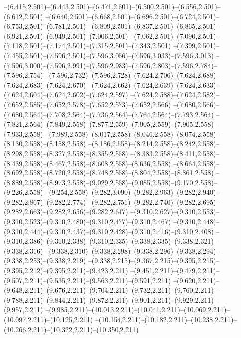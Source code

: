   --(6.415,2.501)--(6.443,2.501)--(6.471,2.501)--(6.500,2.501)--(6.556,2.501)--(6.612,2.501)%
  --(6.640,2.501)--(6.668,2.501)--(6.696,2.501)--(6.724,2.501)--(6.753,2.501)--(6.781,2.501)%
  --(6.809,2.501)--(6.837,2.501)--(6.865,2.501)--(6.921,2.501)--(6.949,2.501)--(7.006,2.501)%
  --(7.062,2.501)--(7.090,2.501)--(7.118,2.501)--(7.174,2.501)--(7.315,2.501)--(7.343,2.501)%
  --(7.399,2.501)--(7.455,2.501)--(7.596,2.501)--(7.596,3.056)--(7.596,3.033)--(7.596,3.013)%
  --(7.596,3.000)--(7.596,2.991)--(7.596,2.983)--(7.596,2.803)--(7.596,2.784)--(7.596,2.754)%
  --(7.596,2.732)--(7.596,2.728)--(7.624,2.706)--(7.624,2.688)--(7.624,2.683)--(7.624,2.670)%
  --(7.624,2.662)--(7.624,2.639)--(7.624,2.633)--(7.624,2.604)--(7.624,2.602)--(7.624,2.597)%
  --(7.624,2.588)--(7.624,2.582)--(7.652,2.585)--(7.652,2.578)--(7.652,2.573)--(7.652,2.566)%
  --(7.680,2.566)--(7.680,2.564)--(7.708,2.564)--(7.736,2.564)--(7.764,2.564)--(7.793,2.564)%
  --(7.821,2.564)--(7.849,2.558)--(7.877,2.559)--(7.905,2.559)--(7.905,2.558)--(7.933,2.558)%
  --(7.989,2.558)--(8.017,2.558)--(8.046,2.558)--(8.074,2.558)--(8.130,2.558)--(8.158,2.558)%
  --(8.186,2.558)--(8.214,2.558)--(8.242,2.558)--(8.298,2.558)--(8.327,2.558)--(8.355,2.558)%
  --(8.383,2.558)--(8.411,2.558)--(8.439,2.558)--(8.467,2.558)--(8.608,2.558)--(8.636,2.558)%
  --(8.664,2.558)--(8.692,2.558)--(8.720,2.558)--(8.748,2.558)--(8.804,2.558)--(8.861,2.558)%
  --(8.889,2.558)--(8.973,2.558)--(9.029,2.558)--(9.085,2.558)--(9.170,2.558)--(9.226,2.558)%
  --(9.254,2.558)--(9.282,3.090)--(9.282,2.963)--(9.282,2.940)--(9.282,2.867)--(9.282,2.774)%
  --(9.282,2.751)--(9.282,2.740)--(9.282,2.695)--(9.282,2.663)--(9.282,2.656)--(9.282,2.647)%
  --(9.310,2.627)--(9.310,2.553)--(9.310,2.523)--(9.310,2.480)--(9.310,2.477)--(9.310,2.467)%
  --(9.310,2.448)--(9.310,2.444)--(9.310,2.437)--(9.310,2.428)--(9.310,2.416)--(9.310,2.408)%
  --(9.310,2.386)--(9.310,2.338)--(9.310,2.335)--(9.338,2.335)--(9.338,2.321)--(9.338,2.316)%
  --(9.338,2.310)--(9.338,2.298)--(9.338,2.296)--(9.338,2.294)--(9.338,2.253)--(9.338,2.219)%
  --(9.338,2.215)--(9.367,2.215)--(9.395,2.215)--(9.395,2.212)--(9.395,2.211)--(9.423,2.211)%
  --(9.451,2.211)--(9.479,2.211)--(9.507,2.211)--(9.535,2.211)--(9.563,2.211)--(9.591,2.211)%
  --(9.620,2.211)--(9.648,2.211)--(9.676,2.211)--(9.704,2.211)--(9.732,2.211)--(9.760,2.211)%
  --(9.788,2.211)--(9.844,2.211)--(9.872,2.211)--(9.901,2.211)--(9.929,2.211)--(9.957,2.211)%
  --(9.985,2.211)--(10.013,2.211)--(10.041,2.211)--(10.069,2.211)--(10.097,2.211)--(10.125,2.211)%
  --(10.154,2.211)--(10.182,2.211)--(10.238,2.211)--(10.266,2.211)--(10.322,2.211)--(10.350,2.211)%
